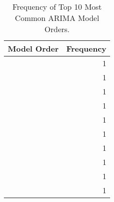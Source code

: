 \begin{table}
\caption{Frequency of Top 10 Most Common ARIMA Model Orders.}
\label{tab:arima_orders}
\begin{tabular}{lr}
\toprule
Model Order & Frequency \\
\midrule
[0 0 0] & 1 \\
[1 0 1] & 1 \\
[2 0 0] & 1 \\
[0 0 1] & 1 \\
[0 0 0] & 1 \\
[0 0 2] & 1 \\
[0 0 0] & 1 \\
[0 0 0] & 1 \\
[0 0 0] & 1 \\
[1 0 1] & 1 \\
\bottomrule
\end{tabular}
\end{table}
